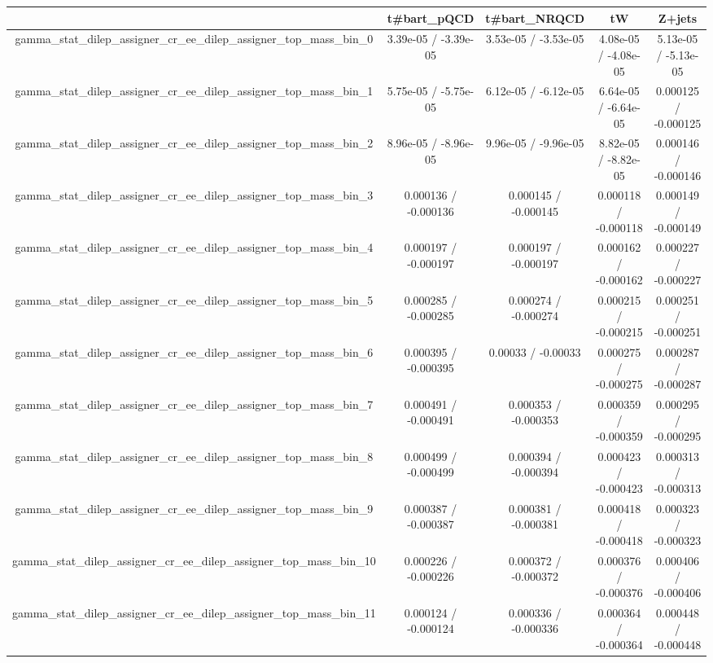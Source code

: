 \documentclass[10pt]{article}
\begin{document}
\begin{table}[htbp]
\begin{center}
\begin{tabular}{|c|c|c|c|c|}
\hline 
      & t#bar{t}_{pQCD}      & t#bar{t}_{NRQCD}      & tW      & Z+jets \\ 
\hline 
  gamma_stat_dilep_assigner_cr_ee_dilep_assigner_top_mass_bin_0 & 3.39e-05 / -3.39e-05 & 3.53e-05 / -3.53e-05 & 4.08e-05 / -4.08e-05 & 5.13e-05 / -5.13e-05 \\ 
  gamma_stat_dilep_assigner_cr_ee_dilep_assigner_top_mass_bin_1 & 5.75e-05 / -5.75e-05 & 6.12e-05 / -6.12e-05 & 6.64e-05 / -6.64e-05 & 0.000125 / -0.000125 \\ 
  gamma_stat_dilep_assigner_cr_ee_dilep_assigner_top_mass_bin_2 & 8.96e-05 / -8.96e-05 & 9.96e-05 / -9.96e-05 & 8.82e-05 / -8.82e-05 & 0.000146 / -0.000146 \\ 
  gamma_stat_dilep_assigner_cr_ee_dilep_assigner_top_mass_bin_3 & 0.000136 / -0.000136 & 0.000145 / -0.000145 & 0.000118 / -0.000118 & 0.000149 / -0.000149 \\ 
  gamma_stat_dilep_assigner_cr_ee_dilep_assigner_top_mass_bin_4 & 0.000197 / -0.000197 & 0.000197 / -0.000197 & 0.000162 / -0.000162 & 0.000227 / -0.000227 \\ 
  gamma_stat_dilep_assigner_cr_ee_dilep_assigner_top_mass_bin_5 & 0.000285 / -0.000285 & 0.000274 / -0.000274 & 0.000215 / -0.000215 & 0.000251 / -0.000251 \\ 
  gamma_stat_dilep_assigner_cr_ee_dilep_assigner_top_mass_bin_6 & 0.000395 / -0.000395 & 0.00033 / -0.00033 & 0.000275 / -0.000275 & 0.000287 / -0.000287 \\ 
  gamma_stat_dilep_assigner_cr_ee_dilep_assigner_top_mass_bin_7 & 0.000491 / -0.000491 & 0.000353 / -0.000353 & 0.000359 / -0.000359 & 0.000295 / -0.000295 \\ 
  gamma_stat_dilep_assigner_cr_ee_dilep_assigner_top_mass_bin_8 & 0.000499 / -0.000499 & 0.000394 / -0.000394 & 0.000423 / -0.000423 & 0.000313 / -0.000313 \\ 
  gamma_stat_dilep_assigner_cr_ee_dilep_assigner_top_mass_bin_9 & 0.000387 / -0.000387 & 0.000381 / -0.000381 & 0.000418 / -0.000418 & 0.000323 / -0.000323 \\ 
  gamma_stat_dilep_assigner_cr_ee_dilep_assigner_top_mass_bin_10 & 0.000226 / -0.000226 & 0.000372 / -0.000372 & 0.000376 / -0.000376 & 0.000406 / -0.000406 \\ 
  gamma_stat_dilep_assigner_cr_ee_dilep_assigner_top_mass_bin_11 & 0.000124 / -0.000124 & 0.000336 / -0.000336 & 0.000364 / -0.000364 & 0.000448 / -0.000448 \\ 

\end{tabular}
\end{center}
\end{table}
\end{document}
